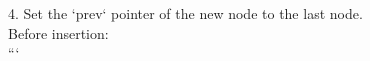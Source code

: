\documentclass[preview]{standalone}
\begin{document}
4. Set the `prev` pointer of the new node to the last node.\\Before insertion:\\```\\
\end{document}
